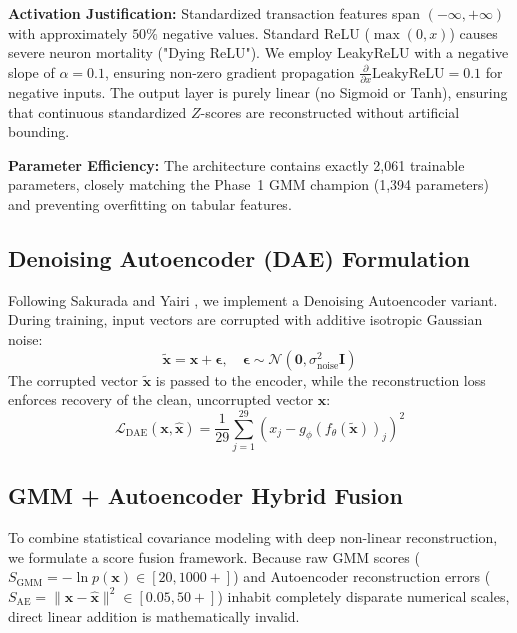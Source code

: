\documentclass[10pt,journal,compsoc]{IEEEtran}
\begin{document}
\textbf{Activation Justification:} Standardized transaction features span $(-\infty, +\infty)$ with approximately $50\%$ negative values. Standard ReLU ($\max(0, x)$) causes severe neuron mortality ("Dying ReLU"). We employ LeakyReLU with a negative slope of $\alpha = 0.1$, ensuring non-zero gradient propagation $\frac{\partial}{\partial x}\text{LeakyReLU} = 0.1$ for negative inputs. The output layer is purely linear (no Sigmoid or Tanh), ensuring that continuous standardized $Z$-scores are reconstructed without artificial bounding.

\textbf{Parameter Efficiency:} The architecture contains exactly 2,061 trainable parameters, closely matching the Phase~1 GMM champion (1,394 parameters) and preventing overfitting on tabular features.

\subsection{Denoising Autoencoder (DAE) Formulation}
Following Sakurada and Yairi \cite{sakurada2014anomaly}, we implement a Denoising Autoencoder variant. During training, input vectors are corrupted with additive isotropic Gaussian noise:
\begin{equation}
    \mathbf{\tilde{x}} = \mathbf{x} + \boldsymbol{\epsilon}, \quad \boldsymbol{\epsilon} \sim \mathcal{N}(\mathbf{0}, \sigma_{\text{noise}}^2 \mathbf{I})
\end{equation}
The corrupted vector $\mathbf{\tilde{x}}$ is passed to the encoder, while the reconstruction loss enforces recovery of the clean, uncorrupted vector $\mathbf{x}$:
\begin{equation}
    \mathcal{L}_{\text{DAE}}(\mathbf{x}, \mathbf{\hat{x}}) = \frac{1}{29} \sum_{j=1}^{29} \left( x_j - g_\phi(f_\theta(\mathbf{\tilde{x}}))_j \right)^2
\end{equation}

\subsection{GMM + Autoencoder Hybrid Fusion}
To combine statistical covariance modeling with deep non-linear reconstruction, we formulate a score fusion framework. Because raw GMM scores ($S_{\text{GMM}} = -\ln p(\mathbf{x}) \in [20, 1000+]$) and Autoencoder reconstruction errors ($S_{\text{AE}} = \|\mathbf{x} - \mathbf{\hat{x}}\|^2 \in [0.05, 50+]$) inhabit completely disparate numerical scales, direct linear addition is mathematically invalid.
\end{document}
